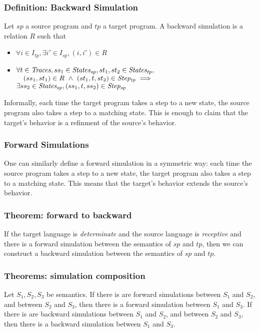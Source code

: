 \subsubsection{Definition: Backward Simulation} Let $sp$ a source program and $tp$ a target program. A backward simulation is a relation $R$ such that
\begin{itemize}
\item $\forall i\in I_{tp}, \exists i'\in I_{sp}, (i,i')\in R$
\item $\forall t\in\mathit{Traces}, ss_1\in\mathit{States_{sp}},st_1,st_2\in\mathit{States_{tp}},$\\
      $\quad(ss_1,st_1)\in R~\wedge~(st_1,t,st_2)\in\mathit{Step_{tp}}\implies$\\
      $\exists ss_2\in\mathit{States_{sp}}, (ss_1,t,ss_2)\in\mathit{Step_{sp}}$
\end{itemize}
Informally, each time the target program takes a step to a new state, the source program also takes a step to a matching state. This is enough to claim that the target's behavior is a refinment of the source's behavior.

\subsubsection{Forward Simulations} One can similarly define a forward simulation in a symmetric way: each time the source program takes a step to a new state, the target program also takes a step to a matching state. This means that the target's behavior extends the source's behavior.

\subsubsection{Theorem: forward to backward} If the target language is \textit{determinate} and the source language is \textit{receptive} and there is a forward simulation between the semantics of $sp$ and $tp$, then we can construct a backward simulation between the semantics of $sp$ and $tp$. 

\subsubsection{Theorems: simulation composition} Let $S_1,S_2,S_3$ be semantics.
If there is are forward simulations between $S_1$ and $S_2$, and between $S_2$ and $S_3$, then there is a forward simulation between $S_1$ and $S_3$.
If there is are backward simulations between $S_1$ and $S_2$, and between $S_2$ and $S_3$, then there is a backward simulation between $S_1$ and $S_3$.


